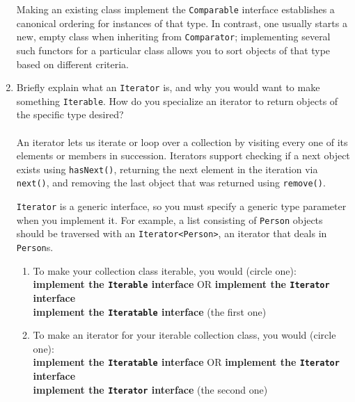 \documentclass[11pt]{article}
\newenvironment{answer}{\large\lstset{basicstyle=\tiny\ttfamily}\color{white} }{}
\newenvironment{answer}{\large\lstset{basicstyle=\large\ttfamily}\color{red} }{}
\begin{document}
\begin{enumerate}
\begin{answer}
Making an existing class implement the \texttt{Comparable} interface establishes a canonical ordering for instances of that type.
In contrast, one usually starts a new, empty class when inheriting from \texttt{Comparator}; implementing several such functors for a particular class allows you to sort objects of that type based on different criteria.
\end{answer}


\newpage
\item Briefly explain what an \texttt{Iterator} is, and why you would want
to make something \texttt{Iterable}. How do you specialize an iterator to return objects of the specific type desired? \\ \\
\begin{answer}
An iterator lets us iterate or loop over a collection by visiting every one of its elements or members in succession.
Iterators support checking if a next object exists using \texttt{hasNext()}, returning the next element in the iteration via \texttt{next()}, and removing the last object that was returned using \texttt{remove()}.

\texttt{Iterator} is a generic interface, so you must specify a generic type parameter when you implement it.
For example, a list consisting of \texttt{Person} objects should be traversed with an \texttt{Iterator<Person>}, an iterator that deals in \texttt{Person}s.
\end{answer}
\begin{enumerate}
	\item To make your collection class iterable, you would (circle one):\\
	\textbf{implement the \texttt{Iterable} interface} OR \textbf{implement the \texttt{Iterator} interface}\\
	\begin{answer}
		\textbf{implement the \texttt{Iteratable} interface} (the first one)
	\end{answer}
	\item To make an iterator for your iterable collection class, you would (circle one):\\
	\textbf{implement the \texttt{Iteratable} interface} OR \textbf{implement the \texttt{Iterator} interface}\\
	\begin{answer}
	\textbf{implement the \texttt{Iterator} interface} (the second one)
	\end{answer}
\end{enumerate}



\end{enumerate}
\end{document}
